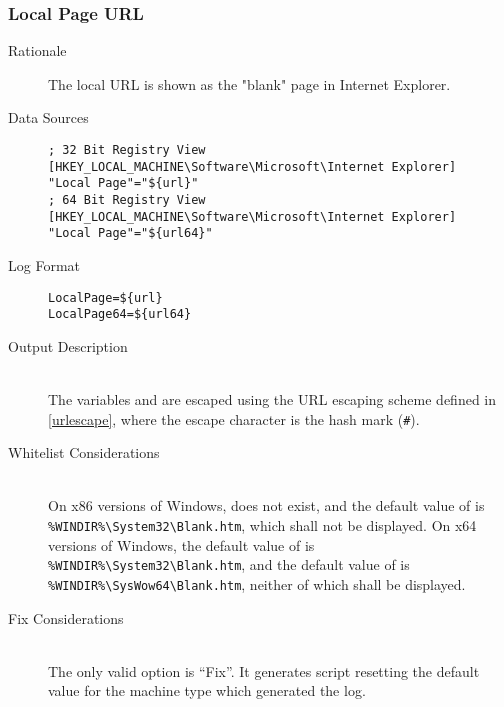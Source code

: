 \subsubsection{Local Page URL}
\begin{description}
\item[Rationale] The local URL is shown as the "blank" page in Internet
Explorer.

\item[Data Sources] \hfill
\vspace{-\baselineskip}
\begin{verbatim}
; 32 Bit Registry View
[HKEY_LOCAL_MACHINE\Software\Microsoft\Internet Explorer]
"Local Page"="${url}"
; 64 Bit Registry View
[HKEY_LOCAL_MACHINE\Software\Microsoft\Internet Explorer]
"Local Page"="${url64}"
\end{verbatim}
\item[Log Format] \hfill
\vspace{-\baselineskip}
\begin{verbatim} 
LocalPage=${url}
LocalPage64=${url64}
\end{verbatim}
\item[Output Description] \hfill \\
The variables  and  are escaped using the URL escaping
scheme defined in \ref{urlescape}, where the escape character is the hash mark
(\verb|#|).
\item[Whitelist Considerations] \hfill \\
On x86 versions of Windows,  does not exist, and the default value of
 is \verb|%WINDIR%\System32\Blank.htm|, which shall not be displayed.
On x64 versions of Windows, the default value of  is
\verb|%WINDIR%\System32\Blank.htm|, and the default value of  is
\verb|%WINDIR%\SysWow64\Blank.htm|, neither of which shall be displayed.
\item[Fix Considerations] \hfill \\
The only valid option is ``Fix''. It generates script resetting the default
value for the machine type which generated the log.
\end{description}

